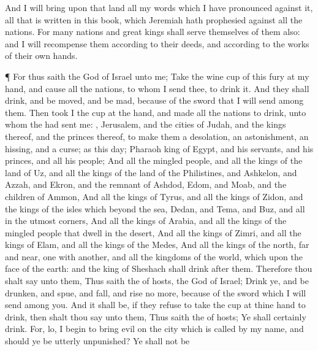 {And I will
bring upon that
land all my
words which I have
pronounced against it,
{} all that is
written in this
book, which
Jeremiah hath
prophesied against all the
nations.
For
many
nations and
great
kings shall
serve themselves of them also: and I will
recompense them according to their
deeds, and according to the
works of their own
hands.
\par }{\PP {}¶ For thus
saith the
{}
God of
Israel unto me;
Take the
wine
cup of this
fury at my
hand, and cause all the
nations, to whom I
send thee, to
drink it.
And they shall
drink, and be
moved, and be
mad,
because of the
sword that I will
send among them.
Then
took I the
cup at the
{}
hand, and made all the
nations to
drink, unto whom the
{} had
sent me:
,
Jerusalem, and the
cities of
Judah, and the
kings thereof, and the
princes thereof, to
make them a
desolation, an
astonishment, an
hissing, and a
curse; as
{} this
day;
Pharaoh
king of
Egypt, and his
servants, and his
princes, and all his
people;
And all the
mingled people, and all the
kings of the
land of
Uz, and all the
kings of the
land of the
Philistines, and
Ashkelon, and
Azzah, and
Ekron, and the
remnant of
Ashdod,
Edom, and
Moab, and the
children of
Ammon,
And all the
kings of
Tyrus, and all the
kings of
Zidon, and the
kings of the
isles which
{}
beyond the
sea,
Dedan, and
Tema, and
Buz, and all
{} in the
utmost
corners,
And all the
kings of
Arabia, and all the
kings of the mingled
people that
dwell in the
desert,
And all the
kings of
Zimri, and all the
kings of
Elam, and all the
kings of the
Medes,
And all the
kings of the
north,
far and
near,
one with
another, and all the
kingdoms of the
world, which
{} upon the
face of the
earth: and the
king of
Sheshach shall
drink
after them.
Therefore thou shalt
say unto them, Thus
saith the
{} of
hosts, the
God of
Israel;
Drink ye, and be
drunken, and
spue, and
fall, and
rise no more,
because of the
sword which I will
send among you.
And it shall be, if they
refuse to
take the
cup at thine
hand to
drink, then shalt thou
say unto them, Thus
saith the
{} of
hosts; Ye shall
certainly
drink.
For, lo, I
begin to bring
evil on the
city which is
called by my
name, and should ye be
utterly
unpunished? Ye shall not be
}
